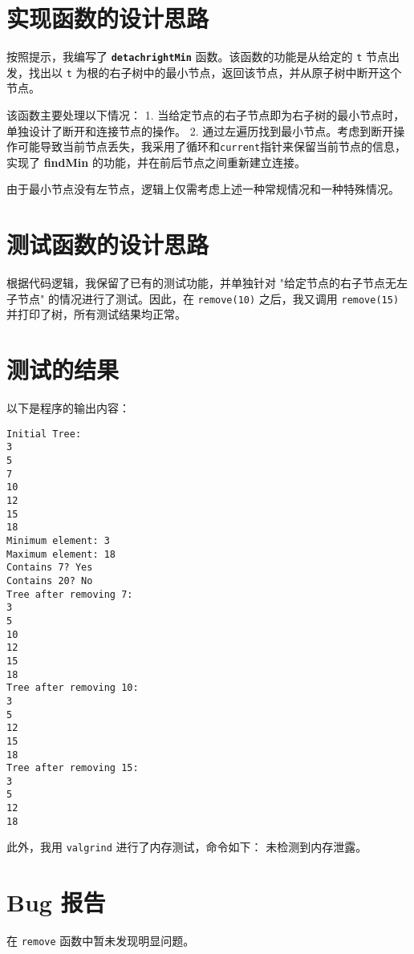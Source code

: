 \documentclass[UTF8]{ctexart}
\begin{document}
\pagestyle{fancy}
\fancyhead{}

\section{实现函数的设计思路}
按照提示，我编写了 \textbf{\texttt{detachrightMin}} 函数。该函数的功能是从给定的 \texttt{t} 节点出发，找出以 \texttt{t} 为根的右子树中的最小节点，返回该节点，并从原子树中断开这个节点。

该函数主要处理以下情况：
1. 当给定节点的右子节点即为右子树的最小节点时，单独设计了断开和连接节点的操作。
2. 通过左遍历找到最小节点。考虑到断开操作可能导致当前节点丢失，我采用了循环和\texttt{current}指针来保留当前节点的信息，实现了 \textbf{findMin} 的功能，并在前后节点之间重新建立连接。

由于最小节点没有左节点，逻辑上仅需考虑上述一种常规情况和一种特殊情况。

\section{测试函数的设计思路}
根据代码逻辑，我保留了已有的测试功能，并单独针对 "给定节点的右子节点无左子节点" 的情况进行了测试。因此，在 \texttt{remove(10)} 之后，我又调用 \texttt{remove(15)} 并打印了树，所有测试结果均正常。
\section{测试的结果}
以下是程序的输出内容：
\begin{verbatim}
Initial Tree:
3
5
7
10
12
15
18
Minimum element: 3
Maximum element: 18
Contains 7? Yes
Contains 20? No
Tree after removing 7:
3
5
10
12
15
18
Tree after removing 10:
3
5
12
15
18
Tree after removing 15:
3
5
12
18
\end{verbatim}

此外，我用 \texttt{valgrind} 进行了内存测试，命令如下：
未检测到内存泄露。

\section{Bug 报告}
在 \texttt{remove} 函数中暂未发现明显问题。
\end{document}
